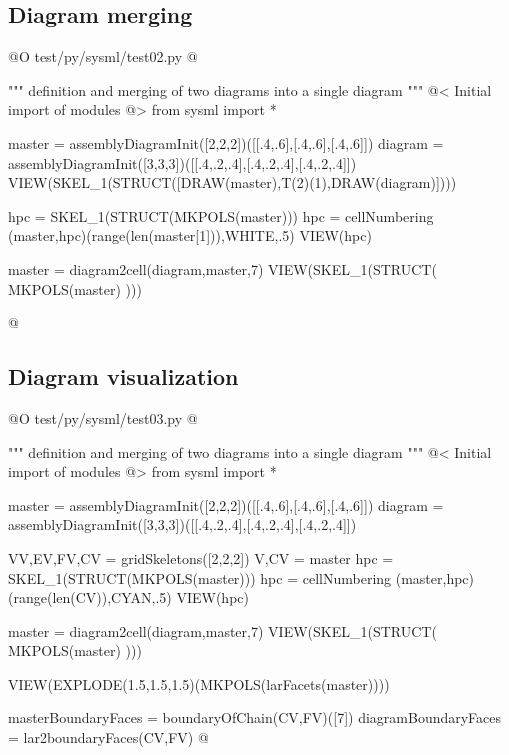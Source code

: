 \documentclass[11pt,oneside]{article}	%
\begin{document}
\subsection{Diagram merging}

@O test/py/sysml/test02.py
@{""" definition and merging of two diagrams into a single diagram """
@< Initial import of modules @>
from sysml import *

master = assemblyDiagramInit([2,2,2])([[.4,.6],[.4,.6],[.4,.6]])
diagram = assemblyDiagramInit([3,3,3])([[.4,.2,.4],[.4,.2,.4],[.4,.2,.4]])
VIEW(SKEL_1(STRUCT([DRAW(master),T(2)(1),DRAW(diagram)])))

hpc = SKEL_1(STRUCT(MKPOLS(master)))
hpc = cellNumbering (master,hpc)(range(len(master[1])),WHITE,.5)
VIEW(hpc)

master = diagram2cell(diagram,master,7)
VIEW(SKEL_1(STRUCT( MKPOLS(master) )))

@}

\subsection{Diagram visualization}


@O test/py/sysml/test03.py
@{""" definition and merging of two diagrams into a single diagram """
@< Initial import of modules @>
from sysml import *

master = assemblyDiagramInit([2,2,2])([[.4,.6],[.4,.6],[.4,.6]])
diagram = assemblyDiagramInit([3,3,3])([[.4,.2,.4],[.4,.2,.4],[.4,.2,.4]])

VV,EV,FV,CV = gridSkeletons([2,2,2])
V,CV = master
hpc = SKEL_1(STRUCT(MKPOLS(master)))
hpc = cellNumbering (master,hpc)(range(len(CV)),CYAN,.5)
VIEW(hpc)

master = diagram2cell(diagram,master,7)
VIEW(SKEL_1(STRUCT( MKPOLS(master) )))

VIEW(EXPLODE(1.5,1.5,1.5)(MKPOLS(larFacets(master))))

masterBoundaryFaces = boundaryOfChain(CV,FV)([7])
diagramBoundaryFaces = lar2boundaryFaces(CV,FV)
@}
\end{document}
